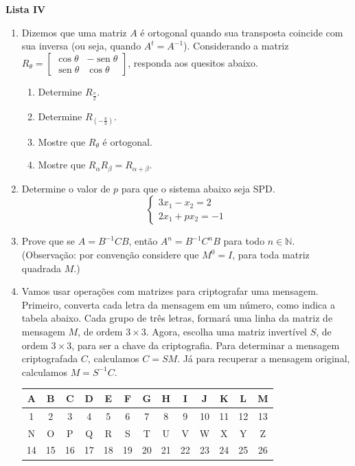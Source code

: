 \documentclass[12pt,a4paper]{article}
\DeclareMathOperator{\sen}{sen}
\begin{document}
\begin{center}
  \textbf{Lista IV}
\end{center}

\begin{enumerate}
  \item  Dizemos que uma matriz $A$ é ortogonal quando sua transposta coincide
    com sua inversa (ou seja, quando $A^t= A^{-1}$). Considerando a matriz
    $R_\theta=
      \begin{bmatrix}
        \cos \theta & -\sen \theta  \\
        \sen \theta & \cos \theta
      \end{bmatrix}$,
    responda aos quesitos abaixo.

    \begin{enumerate}
      \item Determine $R_{\frac{\pi}{2}}$.
      \item Determine $R_{\left(-\frac{\pi}{3}\right)}$.
      \item Mostre que $R_\theta$ é ortogonal.
      \item Mostre que $R_\alpha R_{\beta}=R_{\alpha +\beta}$.
    \end{enumerate}

  \item Determine o valor de $p$ para que o sistema abaixo seja SPD.
    $$\begin{cases}
      3x_1 - x_2 = 2 \\
      2x_1 + px_2 = -1
    \end{cases}$$

  \item Prove que se $A = B^{-1}CB$, então $A^n = B^{-1}C^nB$ para todo $n\in\mathbb{N}$.
    (Observação: por convenção considere que $M^0=I$, para toda matriz quadrada $M$.)

  \item Vamos usar operações com matrizes para criptografar uma mensagem.
    Primeiro, converta cada letra da mensagem em um número, como indica
    a tabela abaixo. Cada grupo de três letras, formará uma linha da matriz
    de mensagem $M$, de ordem $3\times3$. Agora, escolha uma matriz
    invertível $S$, de ordem $3\times3$, para ser a chave da criptografia.
    Para determinar a mensagem criptografada $C$, calculamos $C=SM$.
    Já para recuperar a mensagem original, calculamos $M=S^{-1}C$.

    \begin{center}
      \begin{tabular}{|c|c|c|c|c|c|c|c|c|c|c|c|c|}
      \hline 
      A & B & C & D & E & F & G & H & I & J & K & L & M\\
      \hline 
      1 & 2 & 3 & 4 & 5 & 6 & 7 & 8 & 9 & 10 & 11 & 12 & 13\\
      \hline 
      \hline 
      N & O & P & Q & R & S & T & U & V & W & X & Y & Z\\
      \hline 
      14 & 15 & 16 & 17 & 18 & 19 & 20 & 21 & 22 & 23 & 24 & 25 & 26\\
      \hline 
      \end{tabular}
  \end{center}


\end{enumerate}
\end{document}
